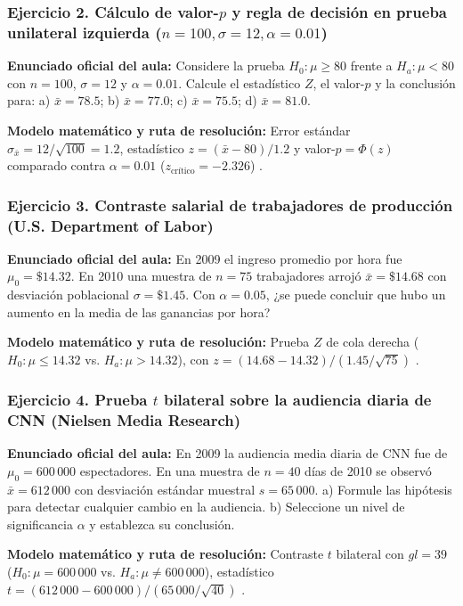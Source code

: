 {\subsubsection*{Ejercicio 2. Cálculo de valor-$p$ y regla de decisión en prueba unilateral izquierda ($n=100, \sigma=12, \alpha=0.01$)}
\textbf{Enunciado oficial del aula:} Considere la prueba $H_0: \mu \ge 80$ frente a $H_a: \mu < 80$ con $n = 100$, $\sigma = 12$ y $\alpha = 0.01$. Calcule el estadístico $Z$, el valor-$p$ y la conclusión para: a) $\bar{x} = 78.5$; b) $\bar{x} = 77.0$; c) $\bar{x} = 75.5$; d) $\bar{x} = 81.0$.

\textbf{Modelo matemático y ruta de resolución:} Error estándar $\sigma_{\bar{x}} = 12/\sqrt{100} = 1.2$, estadístico $z = (\bar{x} - 80)/1.2$ y valor-$p = \Phi(z)$ comparado contra $\alpha = 0.01$ ($z_{\text{crítico}} = -2.326$) \citep{anderson2012}.

\subsubsection*{Ejercicio 3. Contraste salarial de trabajadores de producción (U.S. Department of Labor)}
\textbf{Enunciado oficial del aula:} En 2009 el ingreso promedio por hora fue $\mu_0 = \$14.32$. En 2010 una muestra de $n = 75$ trabajadores arrojó $\bar{x} = \$14.68$ con desviación poblacional $\sigma = \$1.45$. Con $\alpha = 0.05$, ¿se puede concluir que hubo un aumento en la media de las ganancias por hora?

\textbf{Modelo matemático y ruta de resolución:} Prueba $Z$ de cola derecha ($H_0: \mu \le 14.32$ vs. $H_a: \mu > 14.32$), con $z = (14.68 - 14.32)/(1.45/\sqrt{75})$ \citep{anderson2012}.

\subsubsection*{Ejercicio 4. Prueba $t$ bilateral sobre la audiencia diaria de CNN (Nielsen Media Research)}
\textbf{Enunciado oficial del aula:} En 2009 la audiencia media diaria de CNN fue de $\mu_0 = 600\,000$ espectadores. En una muestra de $n = 40$ días de 2010 se observó $\bar{x} = 612\,000$ con desviación estándar muestral $s = 65\,000$. a) Formule las hipótesis para detectar cualquier cambio en la audiencia. b) Seleccione un nivel de significancia $\alpha$ y establezca su conclusión.

\textbf{Modelo matemático y ruta de resolución:} Contraste $t$ bilateral con $gl = 39$ ($H_0: \mu = 600\,000$ vs. $H_a: \mu \ne 600\,000$), estadístico $t = (612\,000 - 600\,000)/(65\,000/\sqrt{40})$ \citep{lind2012}.

}
